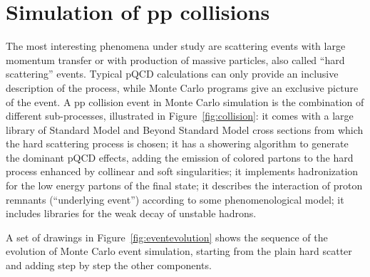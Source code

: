 \section{Simulation of pp collisions}\label{sec:MCsimulation}

The most interesting phenomena under study are scattering events with 
large momentum transfer or with production of massive particles, also
called ``hard scattering'' events.
Typical pQCD calculations can only provide an inclusive description of
the process, while Monte Carlo programs give an exclusive picture
of the event. 
A pp collision event in Monte Carlo simulation
is the combination of different sub-processes,
illustrated in Figure~\ref{fig:collision}: %
it comes with a large library of
Standard Model and Beyond Standard Model cross sections from which the
hard scattering process is chosen; it has a showering algorithm to 
generate the dominant pQCD effects, adding the emission of colored partons
to the hard process enhanced by collinear and soft singularities;
it implements hadronization for the low energy partons of the final
state; it describes the interaction of proton remnants 
(``underlying event'') according to some phenomenological
model; it includes libraries for the weak decay of unstable hadrons.

A set of drawings in Figure~\ref{fig:eventevolution} shows the sequence
of the evolution of Monte Carlo event simulation, starting from the
plain hard scatter and adding step by step the other components.


